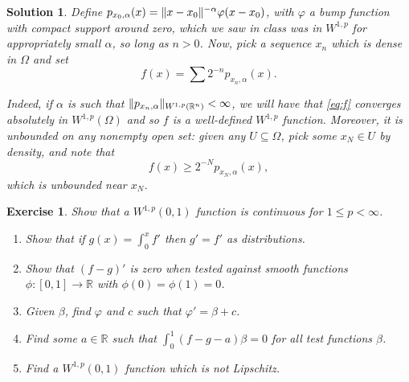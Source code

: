 \documentclass{article}
\newtheorem{ex}{Exercise}
\theoremstyle{nonumberplain}
\newtheorem{sol}{Solution}
\newcommand{\R}{\mathbb{R}}
\DeclarePairedDelimiter{\Norm}{\lVert}{\rVert}
\begin{document}
\begin{sol}
Define $p_{x_0,\alpha}(x) = \Norm{x-x_0}^{-\alpha} \varphi(x-x_0)$, with $\varphi$ a bump function with compact support around zero, which we saw in class was in $W^{1,p}$ for appropriately small $\alpha$, so long as $n > 0$. Now, pick a sequence $x_n$ which is dense in $\Omega$ and set
\begin{equation}\label{eq:f}
f(x) = \sum 2^{-n} p_{x_n, \alpha}(x).
\end{equation}

Indeed, if $\alpha$ is such that $\Norm{p_{x_n,\alpha}}_{W^{1,p}(\R^n)} < \infty$, we will have that \eqref{eq:f} converges absolutely in $W^{1,p}(\Omega)$ and so $f$ is a well-defined $W^{1,p}$ function. Moreover, it is unbounded on any nonempty open set: given any $U \subseteq \Omega$, pick some $x_N \in U$ by density, and note that
\begin{equation}
f(x) \geq 2^{-N} p_{x_N, \alpha}(x),
\end{equation}
which is unbounded near $x_N$.
\end{sol}

\begin{ex}
Show that a $W^{1,p}(0,1)$ function is continuous for $1 \leq p < \infty$.
\begin{enumerate}
\item Show that if $g(x) = \int_0^x f'$ then $g' = f'$ as distributions.
\item Show that $(f-g)'$ is zero when tested against smooth functions $\phi \colon [0,1] \to \R$ with $\phi(0) = \phi(1) = 0$.
\item Given $\beta$, find $\varphi$ and $c$ such that $\varphi' = \beta + c$.
\item Find some $a \in \R$ such that $\int_0^1 (f-g-a) \beta = 0$ for all test functions $\beta$.
\item Find a $W^{1,p}(0,1)$ function which is not Lipschitz.
\end{enumerate}
\end{ex}
\end{document}
